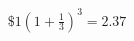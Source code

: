 \documentclass[preview]{standalone}
\begin{document}
\begin{align*}
\$1\left( 1+\frac{1}{3} \right)^{3} = 2.37
\end{align*}
\end{document}
